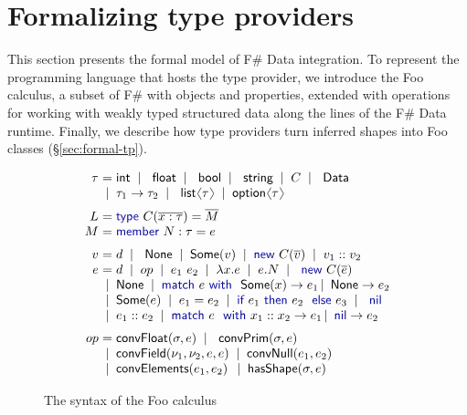 \documentclass[10pt,nocopyrightspace]{sigplanconf}
\newcommand{\langl}{\begin{picture}(4.5,7)
\put(1.1,2.5){\rotatebox{60}{\line(1,0){5.5}}}
\put(1.1,2.5){\rotatebox{300}{\line(1,0){5.5}}}
\end{picture}}
\newcommand{\rangl}{\begin{picture}(4.5,7)
\put(.9,2.5){\rotatebox{120}{\line(1,0){5.5}}}
\put(.9,2.5){\rotatebox{240}{\line(1,0){5.5}}}
\end{picture}}
\newcommand{\kvd}[1]{\textnormal{\textcolor{kvdclr}{\sffamily #1}}}
\newcommand{\ident}[1]{\textnormal{\sffamily #1}}
\newcommand{\lsep}[0]{\;\; | \;\;}
\newcommand{\narrow}[1]{\hspace{-0.7em} #1 \hspace{-0.7em}}
\begin{document}
\section{Formalizing type providers}
\label{sec:formal}

This section presents the formal model of F\# Data integration. To represent the programming
language that hosts the type provider, we introduce the Foo calculus, a subset of F\# with objects
and properties, extended with operations for working with weakly typed structured data along the
lines of the F\# Data runtime. Finally, we describe how
type providers turn inferred shapes into Foo classes (\S\ref{sec:formal-tp}).



\begin{figure}[!h]
\vspace{-0.1em}
\noindent
\begin{equation*}
\begin{array}{rcl}
 \tau &\narrow{=}& \ident{int} \lsep \ident{float} \lsep \ident{bool} \lsep \ident{string} \lsep C \lsep \ident{Data} \\[0.0em]
      &\narrow{|}& \tau_1 \rightarrow \tau_2 \lsep \ident{list}\langl\tau\rangl \lsep \ident{option}\langl\tau\rangl
\\[0.6em]
 L &\narrow{=}& \kvd{type}~C(\overline{x:\tau}) = \overline{M} \\[0.0em]
 M &\narrow{=}& \kvd{member}~N:\tau= e
\\[0.6em]
 v &\narrow{=}& d \lsep \ident{None} \lsep \ident{Some}(v) \lsep \kvd{new}~C(\overline{v}) \lsep v_1::v_2 \\[0.0em]
 e &\narrow{=}& d \lsep op \lsep e_1~e_2 \lsep \lambda x.e \lsep e.N \lsep \kvd{new}~C(\overline{e}) \\
   &\narrow{|}& \ident{None} \lsep\kvd{match}~e~\kvd{with}~\ident{Some}(x) \rightarrow e_1 \,|\, \ident{None} \rightarrow e_2 \\
   &\narrow{|}& \ident{Some}(e) \lsep e_1 = e_2 \lsep {\kvd{if}~e_1~\kvd{then}~e_2~\kvd{else}~e_3} \lsep \kvd{nil} \\
   &\narrow{|}& e_1 :: e_2 \lsep \kvd{match}~e~\kvd{with}~x_1::x_2 \rightarrow e_1 \,|\, \kvd{nil} \rightarrow e_2
\\[0.6em]
op &\narrow{=}& \ident{convFloat}(\sigma, e) \lsep \ident{convPrim}(\sigma, e) \\
   &\narrow{|}& \ident{convField}(\nu_1, \nu_2, e, e) \lsep \ident{convNull}(e_1, e_2) \\
   &\narrow{|}& \ident{convElements}(e_1, e_2) \,\lsep \ident{hasShape}(\sigma, e)
\end{array}
\end{equation*}

\caption{The syntax of the Foo calculus}
\label{fig:foo-syntax}
\vspace{-0.5em}
\end{figure}
\end{document}

